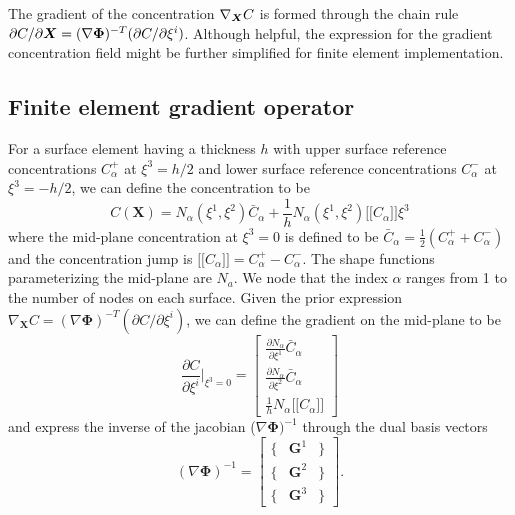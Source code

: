 \documentclass[10pt]{elsarticle}
\newcommand{\mbs}[1]{\boldsymbol{#1}}
\def\ljump{\lbrack\!\lbrack}
\def\rjump{\rbrack\!\rbrack}
\def\bs{{\mbs{s}}} \def\bt{{\mbs{t}}} \def\bu{{\mbs{u}}}
\def\bPhi{{\mbs{\Phi}}}
\def\bs{\boldsymbol}
\begin{document}
The gradient of the concentration $\nabla_{\bX} C$ is formed through the chain rule $\partial C / \partial \bX = (\nabla \bPhi)^{-T}(\partial C / \partial \xi^{i})$. Although helpful, the expression for the gradient concentration field might be further simplified for finite element implementation.

\subsection{Finite element gradient operator}
 For a surface element having a thickness $h$ with upper surface reference concentrations $C_{\alpha}^{+}$ at $\xi^{3} = h/2$ and lower surface reference concentrations $C_{\alpha}^{-}$ at $\xi^{3} = -h/2$, we can define the concentration to be
\begin{equation}
\label{eq.fe.concentration} C(\bs{X}) = N_{\alpha}(\xi^{1},\xi^{2})\bar{C}_{\alpha} + \frac{1}{h} N_{\alpha}(\xi^{1},\xi^{2})\ljump C_{\alpha} \rjump \xi^{3}
\end{equation}
where the mid-plane concentration at $\xi^{3} = 0$ is defined to be $\bar{C}_{\alpha}  = \frac{1}{2}(C_{\alpha}^{+} + C_{\alpha}^{-})$ and the concentration jump is $\ljump C_{\alpha} \rjump = C_{\alpha}^{+} - C_{\alpha}^{-}$. The shape functions parameterizing the mid-plane are $N_{a}$. We node that the index $\alpha$ ranges from 1 to the number of nodes on each surface. Given the prior expression $\nabla_{\bs{X}}C = (\nabla \bPhi)^{-T}(\partial C / \partial \xi^{i})$, we can define the gradient on the mid-plane to be
\begin{equation}
\label{eq.partialCpartialxi} \frac{\partial C}{\partial \xi^{i}}\bigg|_{\xi^{3} = 0} = 
\begin{bmatrix} \frac{\partial N_{\alpha}}{\partial \xi^{1}}\bar{C}_{\alpha}   \\  \frac{\partial N_{\alpha}}{\partial \xi^{2}}\bar{C}_{\alpha} \\ \frac{1}{h} N_{\alpha} \ljump C_{\alpha} \rjump \end{bmatrix}
\end{equation}
and express the inverse of the jacobian ($\nabla \bPhi)^{-1}$ through the dual basis vectors
\begin{equation}
\label{eq.basis.inverse.jacobian}(\nabla \bPhi)^{-1} = 
\begin{bmatrix} 
\{  & \bs{G}^{1} & \} \\
\{  & \bs{G}^{2} & \} \\
\{  & \bs{G}^{3} & \}
 \end{bmatrix}.
\end{equation} 
\end{document}
